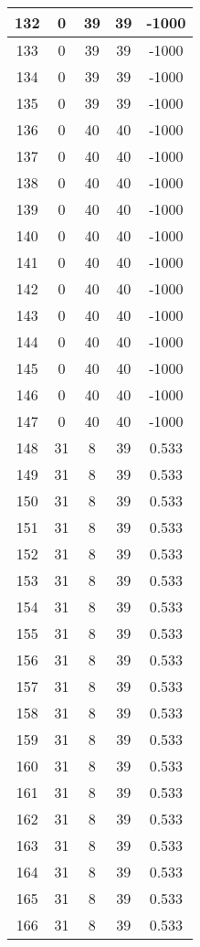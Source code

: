 \documentclass[letterpaper, 12pt]{article}
\begin{document}
\begin{longtable}{|c|c|c|c|c|}
\hline
132 & 0 & 39 & 39 & -1000 \\
\hline
133 & 0 & 39 & 39 & -1000 \\
\hline
134 & 0 & 39 & 39 & -1000 \\
\hline
135 & 0 & 39 & 39 & -1000 \\
\hline
136 & 0 & 40 & 40 & -1000 \\
\hline
137 & 0 & 40 & 40 & -1000 \\
\hline
138 & 0 & 40 & 40 & -1000 \\
\hline
139 & 0 & 40 & 40 & -1000 \\
\hline
140 & 0 & 40 & 40 & -1000 \\
\hline
141 & 0 & 40 & 40 & -1000 \\
\hline
142 & 0 & 40 & 40 & -1000 \\
\hline
143 & 0 & 40 & 40 & -1000 \\
\hline
144 & 0 & 40 & 40 & -1000 \\
\hline
145 & 0 & 40 & 40 & -1000 \\
\hline
146 & 0 & 40 & 40 & -1000 \\
\hline
147 & 0 & 40 & 40 & -1000 \\
\hline
148 & 31 & 8 & 39 & 0.533 \\
\hline
149 & 31 & 8 & 39 & 0.533 \\
\hline
150 & 31 & 8 & 39 & 0.533 \\
\hline
151 & 31 & 8 & 39 & 0.533 \\
\hline
152 & 31 & 8 & 39 & 0.533 \\
\hline
153 & 31 & 8 & 39 & 0.533 \\
\hline
154 & 31 & 8 & 39 & 0.533 \\
\hline
155 & 31 & 8 & 39 & 0.533 \\
\hline
156 & 31 & 8 & 39 & 0.533 \\
\hline
157 & 31 & 8 & 39 & 0.533 \\
\hline
158 & 31 & 8 & 39 & 0.533 \\
\hline
159 & 31 & 8 & 39 & 0.533 \\
\hline
160 & 31 & 8 & 39 & 0.533 \\
\hline
161 & 31 & 8 & 39 & 0.533 \\
\hline
162 & 31 & 8 & 39 & 0.533 \\
\hline
163 & 31 & 8 & 39 & 0.533 \\
\hline
164 & 31 & 8 & 39 & 0.533 \\
\hline
165 & 31 & 8 & 39 & 0.533 \\
\hline
166 & 31 & 8 & 39 & 0.533 \\

\end{longtable}
\end{document}
